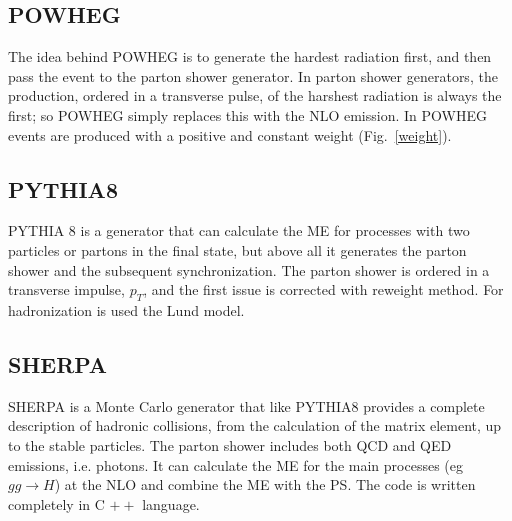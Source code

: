 \subsection*{P{\footnotesize OWHEG}} The idea behind P{\footnotesize OWHEG} \cite{Oleari:2010nx} is to generate the hardest radiation first, and then pass the event to the parton shower generator. In parton shower generators, the production, ordered in a transverse pulse, of the harshest radiation is always the first; so P{\footnotesize OWHEG} simply replaces this with the NLO emission.
In P{\footnotesize OWHEG} events are produced with a positive and constant weight (Fig.~\ref{weight}).
 
 
\subsection*{P{\footnotesize YTHIA}8 } P{\footnotesize YTHIA 8} \cite{bib:pythia} is a generator that can calculate the ME for processes with two particles or partons in the final state, but above all it generates the parton shower and the subsequent synchronization. The parton shower is ordered in a transverse impulse, $ p_T $, and the first issue is corrected with reweight method. For hadronization is used the Lund model.
 
 
\subsection*{S{\footnotesize HERPA}}  S{\footnotesize HERPA}  \cite{bib:sherpa} is a Monte Carlo generator that like PYTHIA8 provides a complete description of hadronic collisions, from the calculation of the matrix element, up to the stable particles. The parton shower includes both QCD and QED emissions, i.e. photons. It can calculate the ME for the main processes (eg $ gg \rightarrow H $) at the NLO and combine the ME with the PS. The code is written completely in C $ ++ $ language.




